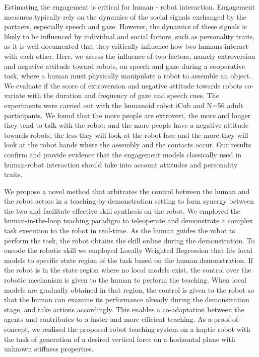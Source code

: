 \documentclass[12pt,a4paper,twoside]{article}
\begin{document}
Estimating the engagement is critical for human - robot interaction. Engagement measures typically rely on the dynamics of the social signals exchanged by the partners, especially speech and gaze. However, the dynamics of these signals is likely to be influenced by individual and social factors, such as personality traits, as it is well documented that they critically influence how two humans interact with each other. Here, we assess the influence of two factors, namely extroversion and negative attitude toward robots, on speech and gaze during a cooperative task, where a human must physically manipulate a robot to assemble an object. We evaluate if the score of extroversion and negative attitude towards robots co-variate with the duration and frequency of gaze and speech cues. The experiments were carried out with the humanoid robot iCub and N=56 adult participants. We found that the more people are extrovert, the more and longer they tend to talk with the robot; and the more people have a negative attitude towards robots, the less they will look at the robot face and the more they will look at the robot hands where the assembly and the contacts occur.
Our results confirm and provide evidence that the engagement models classically used in human-robot interaction should take into account attitudes and personality traits.

We propose a novel method that arbitrates the control between the human and the robot actors in a teaching-by-demonstration setting to form synergy between the two and facilitate effective skill synthesis on the robot. We employed the human-in-the-loop teaching paradigm to teleoperate and demonstrate a complex task execution to the robot in real-time. As the human guides the robot to perform the task, the robot obtains the skill online during the demonstration. To encode the robotic skill we employed Locally Weighted Regression that fits local models to specific state region of the task based on the human demonstration. If the robot is in the state region where no local models exist, the control over the robotic mechanism is given to the human to perform the teaching. When local models are gradually obtained in that region, the control is given to the robot so that the human can examine its performance already during the demonstration stage, and take actions accordingly. This enables a co-adaptation between the agents and contributes to a faster and more efficient teaching. As a proof-of-concept, we realised the proposed robot teaching system on a haptic robot with the task of generation of a desired vertical force on a horizontal plane with unknown stiffness properties.
\end{document}
